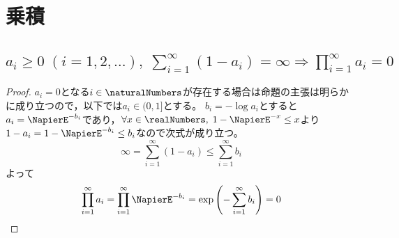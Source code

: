 \chapter{乗積}
    \section{\texorpdfstring{$a_i\geq 0\;(i=1,2,\dotsc),\;\sum_{i=1}^\infty (1-a_i) = \infty \Rightarrow \prod_{i=1}^\infty a_i = 0$}{a\_i≦0 (i=1,2,...), Σ\_\{i=1\}\string^∞ (1-a\_i) = ∞ ⇒ Π\_\{i=1\}\string^∞ a\_i = 0}}
        \begin{proof}
            \quad\par
            $a_i=0$となる$i\in\naturalNumbers$が存在する場合は命題の主張は明らかに成り立つので，以下では$a_i\in(0,1]$とする。
            $b_i=-\log a_i$とすると$a_i=\NapierE^{-b_i}$であり，$\forall x\in\realNumbers,\;1-\NapierE^{-x}\leq x$より$1-a_i=1-\NapierE^{-b_i}\leq b_i$なので次式が成り立つ。
            \[ \infty = \sum_{i=1}^\infty (1-a_i) \leq \sum_{i=1}^\infty b_i \]
            よって
            \[ \prod_{i=1}^\infty a_i = \prod_{i=1}^\infty \NapierE^{-b_i} = \exp\left(-\sum_{i=1}^\infty b_i\right) = 0 \]
        \end{proof}
